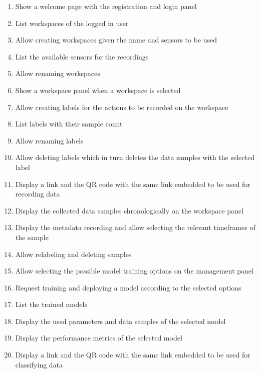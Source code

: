 \begin{enumerate}[{label = \textbf{/F{\protect\twodigits{\arabic{enumi}}}0/}, leftmargin = *}]
    \item \label{/F010/} Show a welcome page with the registration and login panel
    \item List workspaces of the logged in user
    \item Allow creating workspaces given the name and sensors to be used
    \item List the available sensors for the recordings
    \item Allow renaming workspaces
    \item Show a workspace panel when a workspace is selected
    \item Allow creating labels for the actions to be recorded on the workspace
    \item List labels with their sample count
    \item Allow renaming labels
    \item Allow deleting labels which in turn deletes the data samples with the selected label
    \item Display a link and the QR code with the same link embedded to be used for recording data
    \item Display the collected data samples chronologically on the workspace panel
    \item Display the metadata recording and allow selecting the relevant timeframes of the sample
    \item Allow relabeling and deleting samples
    \item Allow selecting the possible model training options on the management panel %
    \item Request training and deploying a model according to the selected options
    \item List the trained models
    \item Display the used parameters and data samples of the selected model
    \item Display the performance metrics of the selected model
    \item Display a link and the QR code with the same link embedded to be used for classifying data
\end{enumerate}

